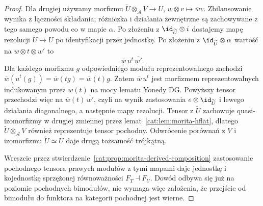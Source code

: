 \begin{proof}
Dla drugiej używamy morfizmu $\widetilde U\otimes_{\mathcal A}V\to U$, $w\otimes v\mapsto\overline w v$. Zbilansowanie wynika z łączności składania; różniczka i działania zewnętrzne są zachowywane z tego samego powodu co w mapie $\alpha$. Po złożeniu z $\id_{\widetilde U}\otimes i$ dostajemy mapę rezolucji $\widetilde U\to U$ po identyfikacji przez jednostkę. Po złożeniu z $\id_{\widetilde U}\otimes\alpha$ wartość na $w\otimes t\otimes w'$ to
\[
 \overline w\,u^t\,\overline {w'}.
\]
Dla każdego morfizmu $g$ odpowiedniego modułu reprezentowalnego zachodzi $\overline w(u^t(g))=\overline w(tg)=\overline w(t)g$. Zatem $\overline w\,u^t$ jest morfizmem reprezentowalnych indukowanym przez $\overline w(t)$ na mocy lematu Yonedy DG. Powyższy tensor przechodzi więc na $\overline w(t)\,\overline {w'}$, czyli na wynik zastosowania $e\otimes\id_{\widetilde U}$ i lewego działania diagonalnego, a następnie mapy rezolucji. Tensor z $\widetilde U$ zachowuje quasi-izomorfizmy w drugiej zmiennej przez lemat~\ref{cat:lem:morita-hflat}, dlatego $\widetilde U\otimes_{\mathcal A}V$ również reprezentuje tensor pochodny. Odwrócenie porównań z $V$ i izomorfizmu $\widetilde U\simeq U$ daje drugą tożsamość trójkątną.

Wreszcie przez stwierdzenie~\ref{cat:prop:morita-derived-composition} zastosowanie pochodnego tensora prawych modułów z tymi mapami daje jednostkę i kojednostkę sprzężonej równoważności $F_T\dashv F_U$. Dowód odbywa się już na poziomie pochodnych bimodułów, nie wymaga więc założenia, że przejście od bimodułu do funktora na kategorii pochodnej jest wierne.
\end{proof}


